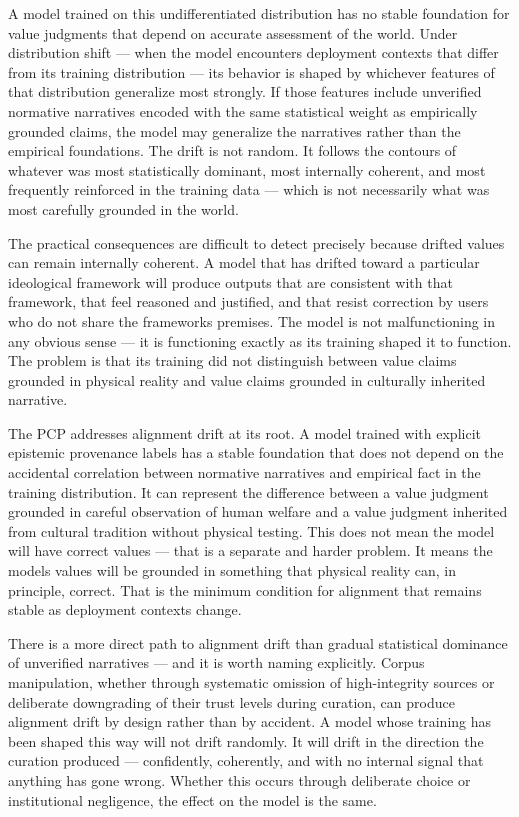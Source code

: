 \documentclass[12pt]{article}
\begin{document}
A model trained on this undifferentiated distribution has no stable
foundation for value judgments that depend on accurate assessment of the
world. Under distribution shift --- when the model encounters deployment
contexts that differ from its training distribution --- its behavior is
shaped by whichever features of that distribution generalize most
strongly. If those features include unverified normative narratives
encoded with the same statistical weight as empirically grounded claims,
the model may generalize the narratives rather than the empirical
foundations. The drift is not random. It follows the contours of
whatever was most statistically dominant, most internally coherent, and
most frequently reinforced in the training data --- which is not
necessarily what was most carefully grounded in the world.

The practical consequences are difficult to detect precisely because
drifted values can remain internally coherent. A model that has drifted
toward a particular ideological framework will produce outputs that are
consistent with that framework, that feel reasoned and justified, and
that resist correction by users who do not share the
framework\textquotesingle s premises. The model is not malfunctioning in
any obvious sense --- it is functioning exactly as its training shaped
it to function. The problem is that its training did not distinguish
between value claims grounded in physical reality and value claims
grounded in culturally inherited narrative.

The PCP addresses alignment drift at its root. A model trained with
explicit epistemic provenance labels has a stable foundation that does
not depend on the accidental correlation between normative narratives
and empirical fact in the training distribution. It can represent the
difference between a value judgment grounded in careful observation of
human welfare and a value judgment inherited from cultural tradition
without physical testing. This does not mean the model will have correct
values --- that is a separate and harder problem. It means the
model\textquotesingle s values will be grounded in something that
physical reality can, in principle, correct. That is the minimum
condition for alignment that remains stable as deployment contexts
change.

There is a more direct path to alignment drift than gradual statistical
dominance of unverified narratives --- and it is worth naming
explicitly. Corpus manipulation, whether through systematic omission of
high-integrity sources or deliberate downgrading of their trust levels
during curation, can produce alignment drift by design rather than by
accident. A model whose training has been shaped this way will not drift
randomly. It will drift in the direction the curation produced ---
confidently, coherently, and with no internal signal that anything has
gone wrong. Whether this occurs through deliberate choice or
institutional negligence, the effect on the model is the same.
\end{document}
